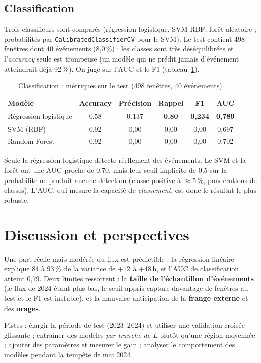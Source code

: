 \documentclass[11pt,a4paper]{article}
\begin{document}
\subsection{Classification}
Trois classifieurs sont comparés (régression logistique, SVM RBF, forêt aléatoire ; probabilités
par \texttt{CalibratedClassifierCV} pour le SVM). Le test contient 498 fenêtres dont 40
événements (8,0\,\%) : les classes sont très déséquilibrées et l'\emph{accuracy} seule est
trompeuse (un modèle qui ne prédit jamais d'événement atteindrait déjà 92\,\%). On juge sur l'AUC
et le F1 (tableau~\ref{tab:clf}).

\begin{table}[h]
\centering\small
\caption{Classification : métriques sur le test (498 fenêtres, 40 événements).}
\label{tab:clf}
\begin{tabular}{lccccc}
\toprule
Modèle & Accuracy & Précision & Rappel & F1 & AUC \\
\midrule
Régression logistique & 0,58 & 0,137 & \textbf{0,80} & \textbf{0,234} & \textbf{0,789} \\
SVM (RBF)             & 0,92 & 0,00  & 0,00 & 0,00 & 0,697 \\
Random Forest         & 0,92 & 0,00  & 0,00 & 0,00 & 0,702 \\
\bottomrule
\end{tabular}
\end{table}

Seule la régression logistique détecte réellement des événements. Le SVM et la forêt ont une AUC
proche de 0,70, mais leur seuil implicite de 0,5 sur la probabilité ne produit aucune détection
(classe positive à $\approx 5$\,\%, pondérations de classes). L'AUC, qui mesure la capacité de
\emph{classement}, est donc le résultat le plus robuste.

\section{Discussion et perspectives}

Une part réelle mais modérée du flux est prédictible : la régression linéaire explique 84 à
93\,\% de la variance de $+12$ à $+48$\,h, et l'AUC de classification atteint 0,79. Deux limites
ressortent : la \textbf{taille de l'échantillon d'événements} (le flux de 2024 étant plus bas, le
seuil appris capture davantage de fenêtres au test et le F1 est instable), et la mauvaise
anticipation de la \textbf{frange externe} et des \textbf{orages}.

Pistes : élargir la période de test (2023--2024) et utiliser une validation croisée glissante ;
entraîner des modèles \emph{par tranche de $L$} plutôt qu'une région moyennée ; ajouter des
paramètres et mesurer le gain ; analyser le comportement des modèles pendant la tempête de mai
2024.
\end{document}
